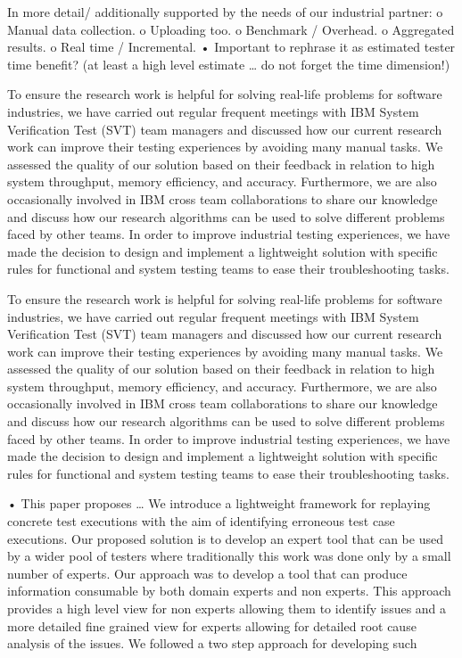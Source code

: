 \documentclass[runningheads,a4paper]{llncs}
\begin{document}
In more detail/ additionally supported by the needs of our industrial partner:
o	Manual data collection.
o	Uploading too.
o	Benchmark / Overhead.
o	Aggregated results.
o	Real time / Incremental.
•	Important to rephrase it as estimated tester time benefit? (at least a high level estimate … do not forget the time dimension!)

To ensure the research work is helpful for solving real-life problems for software
industries, we have carried out regular frequent meetings with IBM System Verification 
Test (SVT) team managers and discussed how our current research work can improve their testing experiences by avoiding many manual tasks. We assessed the quality of our solution based on their feedback in relation to high system throughput, memory efficiency, and accuracy. Furthermore, we are also occasionally involved in IBM cross team collaborations to share our knowledge and discuss how our research algorithms can be used to solve different problems faced by other teams. In order to improve industrial testing experiences, we have made the decision to design and implement a lightweight solution with specific rules for functional and system testing teams to ease their troubleshooting tasks.

To ensure the research work is helpful for solving real-life problems for software
industries, we have carried out regular frequent meetings with IBM System Verification 
Test (SVT) team managers and discussed how our current research work can improve their testing 
experiences by avoiding many manual tasks. We assessed the quality of our solution based on their 
feedback in relation to high system throughput, memory efficiency, and accuracy. Furthermore, we 
are also occasionally involved in IBM cross team collaborations to share our knowledge and 
discuss how our research algorithms can be used to solve different problems faced by other teams. 
In order to improve industrial testing experiences, we have made the decision to design and 
implement a lightweight solution with specific rules for functional and system testing teams 
to ease their troubleshooting tasks.




•	This paper proposes … 
We introduce a lightweight framework for replaying concrete test executions with
the aim of identifying erroneous test case executions.
Our proposed solution is to develop an expert tool that can be used by a wider
pool of testers where traditionally this work was done only by a small number of experts. Our approach was to develop a tool that can 
produce information consumable by both domain experts and non experts. This approach provides a high level view for non experts allowing them to 
identify issues and a more detailed fine grained view for experts allowing for
detailed root cause analysis of the issues. We followed a two step approach for developing such
\end{document}
